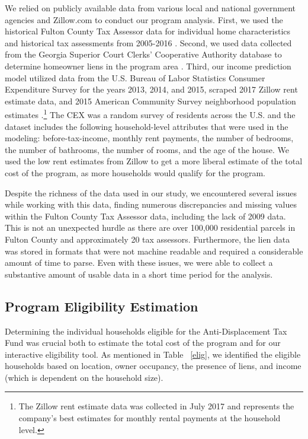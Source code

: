 \documentclass{acm_proc_article-sp}
\begin{document}
We relied on publicly available data from various local and national government agencies and Zillow.com to conduct our program analysis. First, we used the historical Fulton County Tax Assessor data for individual home characteristics and historical tax assessments from 2005-2016 \cite{fcba17}. Second, we used data collected from the Georgia Superior Court Clerks' Cooperative Authority database to determine homeowner liens in the program area \cite{gsccca17}. Third, our income prediction model utilized data from the U.S. Bureau of Labor Statistics Consumer Expenditure Survey for the years 2013, 2014, and 2015, scraped 2017 Zillow rent estimate data, and 2015 American Community Survey neighborhood population estimates \cite{bls16,zill17,uscb15}.\footnote{The Zillow rent estimate data was collected in July 2017 and represents the company's best estimates for monthly rental payments at the household level.} The CEX was a random survey of residents across the U.S. and the dataset includes the following household-level attributes that were used in the modeling: before-tax-income, monthly rent payments, the number of bedrooms, the number of bathrooms, the number of rooms, and the age of the house. We used the low rent estimates from Zillow to get a more liberal estimate of the total cost of the program, as more households would qualify for the program.

Despite the richness of the data used in our study, we encountered several issues while working with this data, finding numerous discrepancies and missing values within the Fulton County Tax Assessor data, including the lack of 2009 data. This is not an unexpected hurdle as there are over 100,000 residential parcels in Fulton County and approximately 20 tax assessors. Furthermore, the lien data was stored in formats that were not machine readable and required a considerable amount of time to parse. Even with these issues, we were able to collect a substantive amount of usable data in a short time period for the analysis.

\subsection{Program Eligibility Estimation}

Determining the individual households eligible for the Anti-Displacement Tax Fund was crucial both to estimate the total cost of the program and for our interactive eligibility tool. As mentioned in Table ~\ref{elig}, we identified the eligible households based on location, owner occupancy, the presence of liens, and income (which is dependent on the household size).
\end{document}
